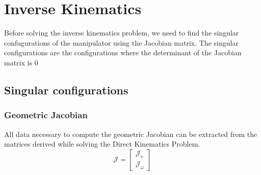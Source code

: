 \section{Inverse Kinematics} \label{sec:inverse_kinematics}
Before solving the inverse kinematics problem, we need to find the singular confugurations of the manipulator
using the Jacobian matrix. The singular configurations are the configurations where the determinant of the Jacobian matrix is $0$

\subsection{Singular configurations} \label{subsec:singularity}
\subsubsection*{Geometric Jacobian}
All data necessary to compute the geometric Jacobian can be
extracted from the matrices derived while solving the Direct Kinematics
Problem.
\begin{equation} \label{eq:J}
    \mathcal{J}=\begin{bmatrix}
        \mathcal{J}_v \\
        \mathcal{J_\omega}
    \end{bmatrix}
\end{equation}

